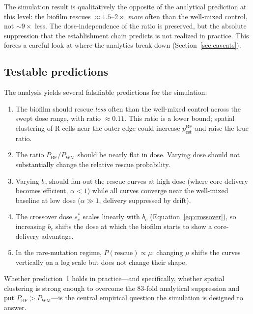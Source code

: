 \documentclass[12pt]{article}
\begin{document}
The simulation result is qualitatively the opposite of the analytical
prediction at this level: the biofilm rescues $\approx 1.5$--$2\times$
\emph{more} often than the well-mixed control, not $\sim 9\times$ less.
The dose-independence of the ratio is preserved, but the absolute
suppression that the establishment chain predicts is not realized in
practice. This forces a careful look at where the analytics break down
(Section~\ref{sec:caveats}).

\subsection{Testable predictions}
\label{sec:predictions}

The analysis yields several falsifiable predictions for the simulation:

\begin{enumerate}
    \item The biofilm should rescue \emph{less} often than the well-mixed
    control across the swept dose range, with ratio $\approx 0.11$. This
    ratio is a lower bound; spatial clustering of R cells near the outer
    edge could increase $p_{\text{est}}^{\text{BF}}$ and raise the true ratio.

    \item The ratio $P_{\text{BF}}/P_{\text{WM}}$ should be nearly flat
    in dose. Varying dose should not substantially change the relative
    rescue probability.

    \item Varying $b_c$ should fan out the rescue curves at high dose
    (where core delivery becomes efficient, $\alpha < 1$) while all curves
    converge near the well-mixed baseline at low dose ($\alpha \gg 1$,
    delivery suppressed by drift).

    \item The crossover dose $s_e^*$ scales linearly with $b_c$
    (Equation~\eqref{eq:crossover}), so increasing $b_c$ shifts the
    dose at which the biofilm starts to show a core-delivery advantage.

    \item In the rare-mutation regime, $P(\text{rescue}) \propto \mu$:
    changing $\mu$ shifts the curves vertically on a log scale but does
    not change their shape.
\end{enumerate}

Whether prediction~1 holds in practice---and specifically, whether spatial
clustering is strong enough to overcome the 83-fold analytical suppression
and put $P_{\text{BF}} > P_{\text{WM}}$---is the central empirical question
the simulation is designed to answer.
\end{document}
